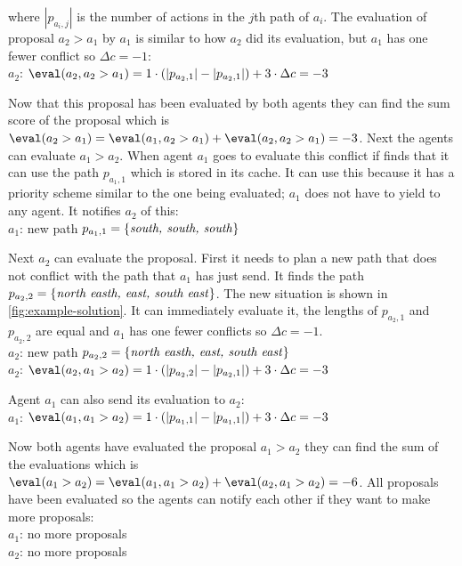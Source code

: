 where $|p_{a_i,j}|$ is the number of actions in the $j$th path of
$a_i$. The evaluation of proposal $a_2 > a_1$ by $a_1$ is similar to how $a_2$
did its evaluation, but $a_1$ has one fewer conflict so $\Delta c = -1$:
\\ \-\qquad $a_2$: $\eval(a_2, a_2 > a_1) = 1 \cdot (|p_{a_2,1}| - |p_{a_2,1}|)
+ 3
\cdot \Delta c = -3$

Now that this proposal has been evaluated by both agents they can find the sum
score of the proposal which is $\eval(a_2 > a_1) = \eval(a_1, a_2 > a_1) +
\eval(a_2, a_2 > a_1) =
-3$. Next the agents can evaluate $a_1 > a_2$. When agent $a_1$ goes to
evaluate this conflict if finds that it can use the path $p_{a_1,1}$ which is
stored in its cache. It can use this because it has a priority scheme similar
to the one being evaluated; $a_1$ does not have to yield to any agent. It
notifies $a_2$ of this:
\\ \-\quad $a_1$: new path $p_{a_1,1} = \{\text{\emph{south, south, south}}\}$

Next $a_2$ can evaluate the proposal. First it needs to plan a new path that
does not conflict with the path that $a_1$ has just send. It finds the path
$p_{a_2,2} = \{\text{\emph{north easth, east, south east}}\}$. The new
situation is shown in \autoref{fig:example-solution}. It can
immediately evaluate it, the lengths of $p_{a_2,1}$ and $p_{a_2,2}$ are equal
and $a_1$ has one fewer conflicts so $\Delta c = -1$.
\\ \-\quad $a_2$: new path $p_{a_2,2} = \{\text{\emph{north easth, east, south
east}}\}$
\\ \-\quad $a_2$: $\eval(a_2, a_1 > a_2) = 1 \cdot (|p_{a_2,2}| - |p_{a_2,1}|)
+ 3 \cdot \Delta c = -3$

Agent $a_1$ can also send its evaluation to $a_2$:
\\ \-\quad $a_1$: $\eval(a_1, a_1 > a_2) = 1 \cdot (|p_{a_1,1}| - |p_{a_1,1}|)
+ 3 \cdot \Delta c = -3$

Now both agents have evaluated the proposal $a_1 > a_2$ they can find the sum
of the evaluations which is $\eval(a_1 > a_2) = \eval(a_1, a_1 > a_2) +
\eval(a_2, a_1 > a_2) =
-6$. All proposals have been evaluated so the agents can notify each other if
they want to make more proposals:
\\ \- \quad $a_1$: no more proposals
\\ \- \quad $a_2$: no more proposals

